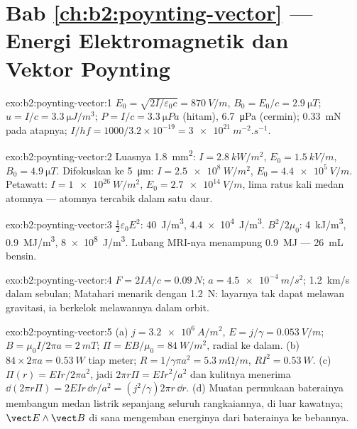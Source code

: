 \section*{Bab \ref{ch:b2:poynting-vector} --- Energi Elektromagnetik dan Vektor Poynting}

\begin{solution}{exo:b2:poynting-vector:1}
$E_0 = \sqrt{2I/\varepsilon_0c} = \qty{870}{V/m}$, $B_0 = E_0/c = \qty{2.9}{\micro T}$; $u = I/c
= \qty{3.3}{\micro J/m^3}$; $P = I/c = \qty{3.3}{\micro Pa}$ (hitam), \qty{6.7}{\micro Pa}
(cermin); \qty{0.33}{mN} pada atapnya; $I/hf = 1000/3.2 \times 10^{-19} = \qty{3e21}{m^{-2}.s^{-1}}$.
\end{solution}

\begin{solution}{exo:b2:poynting-vector:2}
Luasnya \qty{1.8}{mm^2}: $I = \qty{2.8}{kW/m^2}$, $E_0 = \qty{1.5}{kV/m}$, $B_0 = \qty{4.9}{\micro T}$.
Difokuskan ke \qty{5}{\micro m}: $I = \qty{2.5e8}{W/m^2}$, $E_0 = \qty{4.4e5}{V/m}$. Petawatt:
$I = \qty{1e26}{W/m^2}$, $E_0 = \qty{2.7e14}{V/m}$, lima ratus kali medan
atomnya --- atomnya tercabik dalam satu daur.
\end{solution}

\begin{solution}{exo:b2:poynting-vector:3}
$\tfrac12\varepsilon_0E^2$: \qty{40}{J/m^3}, \qty{4.4e4}{J/m^3}. $B^2/2\mu_0$: \qty{4}{kJ/m^3},
\qty{0.9}{MJ/m^3}, \qty{8e8}{J/m^3}. Lubang MRI-nya menampung \qty{0.9}{MJ} --- \qty{26}{mL}
bensin.
\end{solution}

\begin{solution}{exo:b2:poynting-vector:4}
$F = 2IA/c = \qty{0.09}{N}$; $a = \qty{4.5e-4}{m/s^2}$; \qty{1.2}{km/s} dalam sebulan;
Matahari menarik dengan \qty{1.2}{N}: layarnya tak dapat melawan gravitasi, ia berkelok
melawannya dalam orbit.
\end{solution}

\begin{solution}{exo:b2:poynting-vector:5}
(a) $j = \qty{3.2e6}{A/m^2}$, $E = j/\gamma = \qty{0.053}{V/m}$; $B = \mu_0I/2\pi a = \qty{2}{mT}$;
$\Pi = EB/\mu_0 = \qty{84}{W/m^2}$, radial ke dalam. (b) $84 \times 2\pi a = \qty{0.53}{W}$
tiap meter; $R = 1/\gamma\pi a^2 = \qty{5.3}{m\ohm/m}$, $RI^2 = \qty{0.53}{W}$. (c) $\Pi(r)
= EIr/2\pi a^2$, jadi $2\pi r\Pi = EIr^2/a^2$ dan kulitnya menerima $\dd(2\pi r\Pi)
= 2EIr\,\dd r/a^2 = (j^2/\gamma)2\pi r\,\dd r$. (d) Muatan permukaan baterainya
membangun medan listrik sepanjang seluruh rangkaiannya, di luar kawatnya;
$\vect E\wedge\vect B$ di sana mengemban energinya dari baterainya ke bebannya.
\end{solution}

